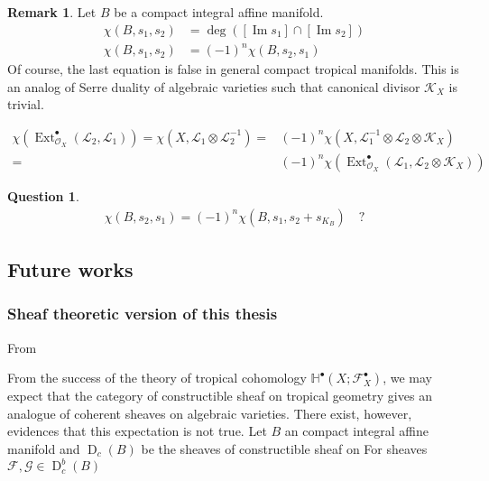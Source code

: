 \documentclass[a4paper,dvipdfmx,reqno,12pt]{amsart}
\theoremstyle{definition}
\newtheorem{Ques}[Thm]{Question}
\newtheorem{Rmk}[Thm]{Remark}
\newcommand{\mb}[1]{\mathbb{#1}}%
\newcommand{\mcal}[1]{\mathcal{#1}}%
\newcommand{\opn}[1]{\operatorname{#1}}
\numberwithin{equation}{section}
\begin{document}
\begin{Rmk}
  Let $B$ be a compact integral affine manifold.
  \begin{align}
    \chi(B,s_1,s_2) & =\opn{deg}([\opn{Im}s_1]\cap [\opn{Im}s_2]) \\
    \chi(B,s_1,s_2) & =(-1)^{n}\chi(B,s_2,s_1)
  \end{align}
  Of course, the last equation is false in general compact tropical manifolds. This is an analog of Serre duality of algebraic varieties such that canonical divisor $\mcal{K}_X$ is trivial.

  \begin{align}
    \chi(\opn{Ext}^{\bullet}_{\mcal{O}_X}(\mcal{L}_2,\mcal{L}_1))=\chi(X,\mcal{L}_1\otimes \mcal{L}_2^{-1})= & (-1)^{n}\chi(X,\mcal{L}_1^{-1}\otimes \mcal{L}_2\otimes \mcal{K}_X)                     \\
    =                                                                                                        & (-1)^{n}\chi(\opn{Ext}^{\bullet}_{\mcal{O}_X}(\mcal{L}_1,\mcal{L}_2\otimes \mcal{K}_X))
  \end{align}

  \begin{Ques}
    \begin{align}
      \chi(B,s_2,s_1)=(-1)^{n}\chi(B,s_1,s_2+s_{K_B}) \quad ?
    \end{align}
  \end{Ques}

\end{Rmk}

\subsection{Future works}

\subsubsection{Sheaf theoretic version of this thesis}

From

From the success of the theory of tropical cohomology
$\mb{H}^{\bullet}(X;\mcal{F}_X^{\bullet})$,
we may expect that the category of constructible sheaf
on tropical geometry gives an analogue of coherent
sheaves on algebraic varieties.
There exist, however, evidences that
this expectation is not true.
Let $B$ an compact integral affine manifold and
$\opn{D}_c(B)$ be the sheaves of constructible sheaf
on
For sheaves $\mcal{F},\mcal{G}\in \opn{D}_{c}^{b}(B)$
\end{document}
